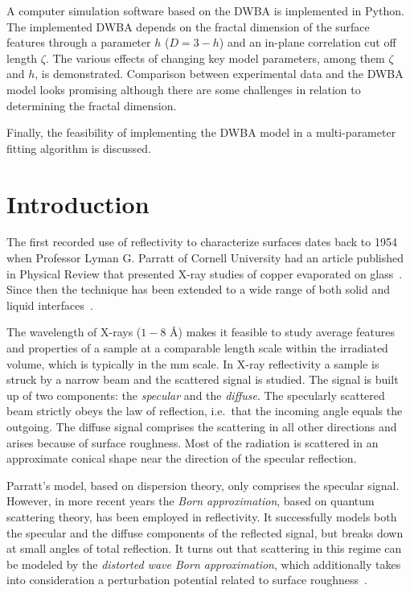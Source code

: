 \documentclass[10pt,twoside, b5paper,pdftex]{report}
\begin{document}
A computer simulation software based on the DWBA is implemented in Python. The implemented DWBA  depends on the fractal dimension of the surface features through a parameter $h$ ($D = 3 - h$) and an in-plane correlation cut off length $\zeta$. The various effects of changing key model parameters, among them $\zeta$ and $h$, is demonstrated. Comparison between experimental data and the DWBA model looks promising although there are some challenges in relation to determining the fractal dimension.

Finally, the feasibility of implementing the  DWBA model in a multi-parameter fitting algorithm is discussed. 


\tableofcontents


\chapter{Introduction}
The first recorded use of reflectivity to characterize surfaces dates back to 1954 when Professor Lyman G. Parratt of Cornell University had an article published in Physical Review that presented X-ray studies of copper evaporated on glass~\cite{PARRATT}. Since then the technique has been extended to a wide range of both solid and liquid interfaces~\cite{PORTEUS,BRASLAU,ELSON}. 

The wavelength of X-rays ($1 - 8$ \si{\angstrom}) makes it feasible to study average features and properties of a sample at a comparable length scale within the irradiated volume, which is typically in the \si{\milli\meter} scale. In X-ray reflectivity a sample is struck by a narrow beam and the scattered signal is studied. The signal is built up of two components: the {\it specular} and the {\it diffuse}. The specularly scattered beam strictly obeys the law of reflection, i.e.~that the incoming angle equals the outgoing. The diffuse signal comprises the scattering in all other directions and arises because of surface roughness. Most of the radiation is scattered in an approximate conical shape near the direction of the specular reflection. 

Parratt's model, based on dispersion theory, only comprises  the specular signal. However, in more recent years the {\it Born approximation}, based on quantum scattering theory, has been employed in reflectivity\cite{SAXS}. It successfully models both the specular and the diffuse components of the reflected signal, but breaks down at small angles of total reflection. It turns out that scattering in this regime can be modeled by the {\it distorted wave Born approximation}, which additionally takes into consideration a perturbation potential related to surface roughness~\cite{SINHA,HOLY}.
\end{document}
